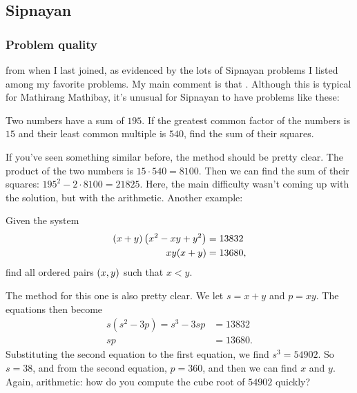 \documentclass[11pt,paper=letter]{scrartcl}
\begin{document}
\subsection{Sipnayan}

\subsubsection*{Problem quality}

 from when I last joined, as evidenced by the lots of Sipnayan problems I listed among my favorite problems. My main comment is that . Although this is typical for Mathirang Mathibay, it's unusual for Sipnayan to have problems like these:

\begin{probboxed}
   Two numbers have a sum of $195$. If the greatest common factor of the numbers is $15$ and their least common multiple is $540$, find the sum of their squares.
\end{probboxed}

If you've seen something similar before, the method should be pretty clear. The product of the two numbers is $15 \cdot 540 = 8100$. Then we can find the sum of their squares: $195^2 - 2 \cdot 8100 = 21825$. Here, the main difficulty wasn't coming up with the solution, but with the arithmetic. Another example:

\begin{probboxed}
   Given the system \begin{align*}
    \left( x + y \right)\left( x^2 - xy + y^2 \right) &= 13832 \\
    xy(x + y) &= 13680,
  \end{align*} find all ordered pairs $\left( x ,y \right)$ such that $x < y$. 
\end{probboxed}

The method for this one is also pretty clear. We let $s = x + y$ and $p = xy$. The equations then become
\begin{align*}
  s(s^2 - 3p) = s^3 - 3sp &= 13832 \\
  sp &= 13680.
\end{align*}
Substituting the second equation to the first equation, we find $s^3 = 54902$. So $s = 38$, and from the second equation, $p = 360$, and then we can find $x$ and $y$. Again, arithmetic: how do you compute the cube root of $54902$ quickly?
\end{document}
